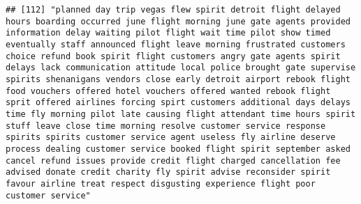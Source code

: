 \documentclass[
]{article}
\begin{document}
\begin{verbatim}
## [112] "planned day trip vegas flew spirit detroit flight delayed hours boarding occurred june flight morning june gate agents provided information delay waiting pilot flight wait time pilot show timed eventually staff announced flight leave morning frustrated customers choice refund book spirit flight customers angry gate agents spirit delays lack communication attitude local police brought gate supervise spirits shenanigans vendors close early detroit airport rebook flight food vouchers offered hotel vouchers offered wanted rebook flight sprit offered airlines forcing spirt customers additional days delays time fly morning pilot late causing flight attendant time hours spirit stuff leave close time morning resolve customer service response spirits spirits customer service agent useless fly airline deserve process dealing customer service booked flight spirit september asked cancel refund issues provide credit flight charged cancellation fee advised donate credit charity fly spirit advise reconsider spirit favour airline treat respect disgusting experience flight poor customer service"                                                                                                                                                                                                                                                                                                                                                                                                                                                                                                                                                                                                                                                        

\end{verbatim}
\end{document}
